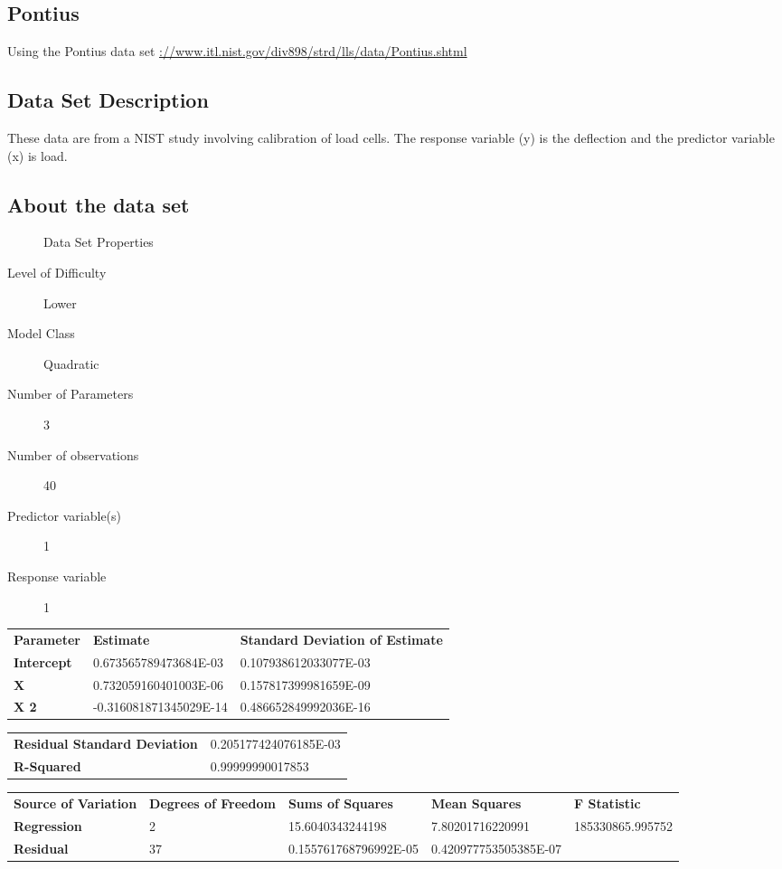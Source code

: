 \documentclass[10pt]{article}
\begin{document}
\subsection{Pontius}
Using the Pontius data set \url{://www.itl.nist.gov/div898/strd/lls/data/Pontius.shtml}

\subsection*{Data Set Description}
These data are from a NIST study involving calibration of load cells. The response variable (y) is the deflection and the predictor variable (x) is load.


\subsection*{About the data set}

\begin{description}
   \item[]Data Set Properties
   \item[Level of Difficulty] Lower
   \item[Model Class] Quadratic
   \item[Number of Parameters] 3
   \item[Number of observations] 40
   \item[Predictor variable(s)] 1
   \item[Response variable] 1
\end{description}

\begin{tabular}{lll}
   \textbf{Parameter} & \textbf{Estimate} & \textbf{Standard Deviation of Estimate}  \\ 
   \textbf{Intercept} & 0.673565789473684E-03 &  0.107938612033077E-03\\ 
	\textbf{X} & 0.732059160401003E-06  &   0.157817399981659E-09 \\ 
   \textbf{X 2} & -0.316081871345029E-14  &  0.486652849992036E-16 \\ 
\end{tabular} 

\begin{tabular}{ll}
    \textbf{Residual Standard Deviation} &  0.205177424076185E-03  \\ 
    \textbf{R-Squared} & 0.99999990017853   \\  
\end{tabular}


\begin{tabular}{lllll}
   \textbf{Source of Variation} & \textbf{Degrees of Freedom} & \textbf{Sums of Squares} & \textbf{Mean Squares}  & \textbf{F Statistic} \\ 
   \textbf{Regression} & 2 & 15.6040343244198 & 7.80201716220991 & 185330865.995752 \\ 
	\textbf{Residual} & 37 & 0.155761768796992E-05 & 0.420977753505385E-07 &  \\ 
\end{tabular} 
\end{document}

